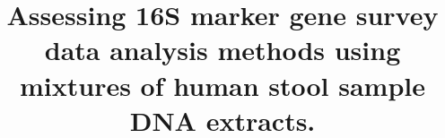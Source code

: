 \documentclass[linenumbers]{bmcart}
\begin{document}
\begin{frontmatter}

\begin{fmbox}


\title{Assessing 16S marker gene survey data analysis methods using mixtures of human stool sample DNA extracts.}


\author[
   addressref={aff1,aff2,aff3},                   %
   corref={aff1},                       %
   email={nolson@nist.gov}   %
]{ }
\author[
   addressref={aff2,aff3},
   email={smuthiah@umiacs.umd.edu}
]{ }
\author[
   addressref={aff4},
   email={sli1@epi.umaryland.edu}
]{ }
\author[
   addressref={aff5},
   email={shao4@jhu.edu}
]{ }
\author[
   addressref={aff5},
   email={wtimp@jhu.edu}
]{ }
\author[
   addressref={aff6},
   email={msalit@stanford.edu}
]{ }
\author[
   addressref={aff4},
   email={cstine@som.umaryland.edu}
]{ }
\author[
   addressref={aff2,aff3,aff7},
   email={hcorrada@umiacs.umd.edu}
]{ }




\end{fmbox}
\end{frontmatter}
\end{document}
